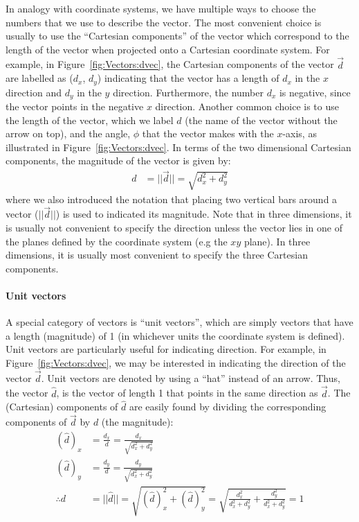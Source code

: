 In analogy with coordinate systems, we have multiple ways to choose the numbers that we use to describe the vector. The most convenient choice is usually to use the ``Cartesian components'' of the vector which correspond to the length of the vector when projected onto a Cartesian coordinate system. For example, in Figure~\ref{fig:Vectors:dvec}, the Cartesian components of the vector $\vec d$ are labelled as ($d_x$, $d_y$) indicating that the vector has a length of $d_x$ in the $x$ direction and $d_y$ in the $y$ direction. Furthermore, the number $d_x$ is negative, since the vector points in the negative $x$ direction. Another common choice is to use the length of the vector, which we label $d$ (the name of the vector without the arrow on top), and the angle, $\phi$ that the vector makes with the $x$-axis, as illustrated in Figure~\ref{fig:Vectors:dvec}. In terms of the two dimensional Cartesian components, the magnitude of the vector is given by:
\begin{align*}
d&= ||\vec d||= \sqrt{d_x^2+d_y^2}
\end{align*}
where we also introduced the notation that placing two vertical bars around a vector ($||\vec d||$) is used to indicated its magnitude. Note that in three dimensions, it is usually not convenient to specify the direction unless the vector lies in one of the planes defined by the coordinate system (e.g the $xy$ plane). In three dimensions, it is usually most convenient to specify the three Cartesian components.

\paragraph{Unit vectors}

A special category of vectors is ``unit vectors'', which are simply vectors that have a length (magnitude) of 1 (in whichever units the coordinate system is defined). Unit vectors are particularly useful for indicating direction. For example, in Figure~\ref{fig:Vectors:dvec}, we may be interested in indicating the direction of the vector $\vec d$. Unit vectors are denoted by using a ``hat'' instead of an arrow. Thus, the vector $\hat d$, is the vector of length 1 that points in the same direction as $\vec d$. The (Cartesian) components of $\hat d$ are easily found by dividing the corresponding components of $\vec d$ by $d$ (the magnitude):
\begin{align*}
(\hat d)_x &= \frac{d_x}{d}=\frac{d_x}{\sqrt{d_x^2+d_y^2}}\\
(\hat d)_y &= \frac{d_y}{d}=\frac{d_y}{\sqrt{d_x^2+d_y^2}}\\
\therefore d &= ||\hat d||=\sqrt{(\hat d)_x^2+(\hat d)_y^2}=\sqrt{\frac{d_x^2}{d_x^2+d_y^2}+\frac{d_y^2}{d_x^2+d_y^2}}=1
\end{align*}

